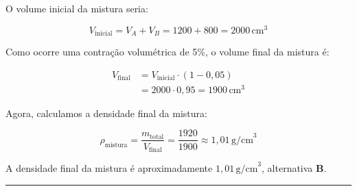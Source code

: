 \documentclass[a4paper,12pt]{article}
\begin{document}
\begin{flushleft}
\noindent
O volume inicial da mistura seria:

\[
V_{\text{inicial}} = V_A + V_B = 1200 + 800 = 2000\,\text{cm}^3
\]

\noindent
Como ocorre uma contração volumétrica de 5\%, o volume final da mistura é:

\begin{align*}
V_{\text{final}} &= V_{\text{inicial}} \cdot (1 - 0{,}05) \\
&= 2000 \cdot 0{,}95 = 1900\,\text{cm}^3
\end{align*}

\noindent
Agora, calculamos a densidade final da mistura:

\[
\rho_{\text{mistura}} = \frac{m_{\text{total}}}{V_{\text{final}}} = \frac{1920}{1900} \approx 1{,}01\,\text{g/cm}^3
\]

\noindent
A densidade final da mistura é aproximadamente \( \boxed{1{,}01\,\text{g/cm}^3} \), alternativa \colorbox{green!50}{\textbf{B}}.

\end{flushleft}

\noindent\rule{\linewidth}{0.6pt}\\
\end{document}
